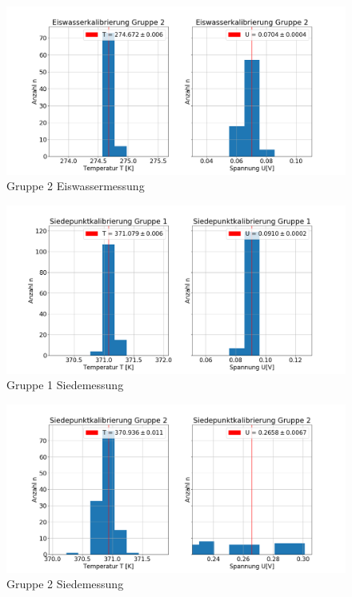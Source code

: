 \documentclass[a4paper, 11pt]{article}
\begin{document}
\begin{figure}[H]
	\includegraphics[scale=0.4]{Bilder/Gruppe2_Eiswasser.png}%
	\caption[Gruppe 2 Eiswassermessung]{Gruppe 2 Eiswassermessung}%
	\label{pic:G2Eismessung}%
\end{figure}

\begin{figure}[H]
	\includegraphics[scale=0.4]{Bilder/Gruppe1_kochendesWasser.png}%
	\caption[Gruppe 1 Siedemessung]{Gruppe 1 Siedemessung}%
	\label{pic:G1Siedemessung}%
\end{figure}

\begin{figure}[H]
	\includegraphics[scale=0.4]{Bilder/Gruppe2_kochendesWasser.png}%
	\caption[Gruppe 2 Siedemessung]{Gruppe 2 Siedemessung}%
	\label{pic:G12Siedemessung}%
\end{figure}
\end{document}
